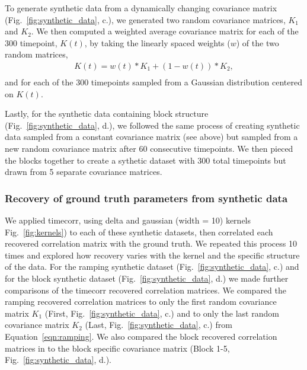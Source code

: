 To generate synthetic data from a dynamically changing covariance
matrix (Fig.~\ref{fig:synthetic_data},  c.),
we generated two random covariance
matrices, $K_{1}$ and $K_{2}$.  We then computed a weighted average covariance matrix
for each of the 300 timepoint, $K(t)$, 
by taking the linearly spaced weights ($w$) of the two random matrices, 
\begin{align}
K(t) = w(t) * K_{1} + (1 - w(t)) *  K_{2}, \\\label{eqn:ramping}
\end{align}
and for each of the 300 timepoints sampled from a
Gaussian distribution centered on $K(t)$.

Lastly, for the synthetic data containing block structure (Fig.~\ref{fig:synthetic_data},  d.), we followed the same
process of creating synthetic data sampled from a constant covariance
matrix (see above) but sampled from a new random covariance matrix
after 60 consecutive timepoints.  We then pieced the blocks together
to create a sythetic dataset with 300 total timepoints but drawn from
5 separate covariance matrices. 

\subsubsection*{Recovery of ground truth parameters from synthetic
  data}


We applied timecorr, using delta and gaussian (width = 10) kernels
Fig.~\ref{fig:kernels}) to each of these 
synthetic datasets, then correlated each recovered
correlation matrix with the ground truth.  We repeated this process 10
times and explored how recovery varies
with the kernel and the specific structure of the data. For the
ramping synthetic dataset (Fig.~\ref{fig:synthetic_data},  c.)  and for the
block synthetic dataset (Fig.~\ref{fig:synthetic_data},  d.)  we made further
comparisons of the timecorr recovered correlation matrices. We
compared the ramping recovered correlation matrices to only the first random covariance matrix $K_{1}$
(First, Fig.~\ref{fig:synthetic_data},  c.) and to only the last
random covariance matrix $K_{2}$ (Last, Fig.~\ref{fig:synthetic_data},
c.) from Equation~\ref{eqn:ramping}. We also compared the block recovered correlation matrices in to
the block specific covariance matrix (Block 1-5,
Fig.~\ref{fig:synthetic_data},  d.).










